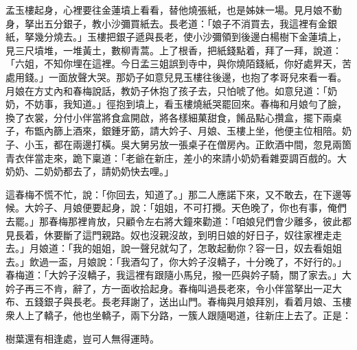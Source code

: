 孟玉樓起身，心裡要往金蓮墳上看看，替他燒張紙，也是姊妹一場。見月娘不動身，{}拏出五分銀子，教小沙彌買紙去。長老道：「娘子不消買去，我這裡有金銀紙，拏幾分燒去。」玉樓把銀子遞與長老，使小沙彌領到後邊白楊樹下金蓮墳上，見三尺墳堆，一堆黃土，數柳青蒿。{}上了根香，把紙錢點着，拜了一拜，說道：「六姐，不知你埋在這裡。今日孟三姐誤到寺中，與你燒陌錢紙，你好處昇天，苦處用錢。」一面放聲大哭。那奶子如意兒見玉樓往後邊，也抱了孝哥兒來看一看。月娘在方丈內和春梅說話，教奶子休抱了孩子去，只怕唬了他。如意兒道：「奶奶，不妨事，我知道。」徑抱到墳上，看玉樓燒紙哭罷回來。春梅和月娘勻了臉，換了衣裳，分付小伴當將食盒開啟，將各樣細菓甜食，餚品點心攢盒，擺下兩桌子，布甑內篩上酒來，銀鍾牙筯，請大妗子、月娘、玉樓上坐，他便主位相陪。奶子、小玉，都在兩邊打橫。吳大舅另放一張桌子在僧房內。正飲酒中間，忽見兩箇青衣伴當走來，跪下稟道：「老爺在新庄，差小的來請小奶奶看雜耍調百戲的。大奶奶、二奶奶都去了，請奶奶快去哩。」

這春梅不慌不忙，{}說：「你回去，知道了。」那二人應諾下來，又不敢去，在下邊等候。大妗子、月娘便要起身，說：「姐姐，不可打攪。天色晚了，你也有事，俺們去罷。」那春梅那裡肯放，只顧令左右將大鐘來勸道：「咱娘兒們會少離多，彼此都見長着，休要斷了這門親路。奴也沒親沒故，到明日娘的好日子，奴往家裡走走去。」月娘道：「我的姐姐，說一聲兒就勾了，怎敢起動你？容一日，奴去看姐姐去。」{}飲過一盃，月娘說：「我酒勾了，你大妗子沒轎子，十分晚了，不好行的。」春梅道：「大妗子沒轎子，我這裡有跟隨小馬兒，撥一匹與妗子騎，關了家去。」大妗子再三不肯，辭了，方一面收拾起身。春梅叫過長老來，令小伴當拏出一疋大布、五錢銀子與長老。長老拜謝了，送出山門。春梅與月娘拜別，看着月娘、玉樓衆人上了轎子，他也坐轎子，兩下分路，一簇人跟隨喝道，往新庄上去了。正是：

\begin{myquote}
樹葉還有相逢處，豈可人無得運時。
\end{myquote}

